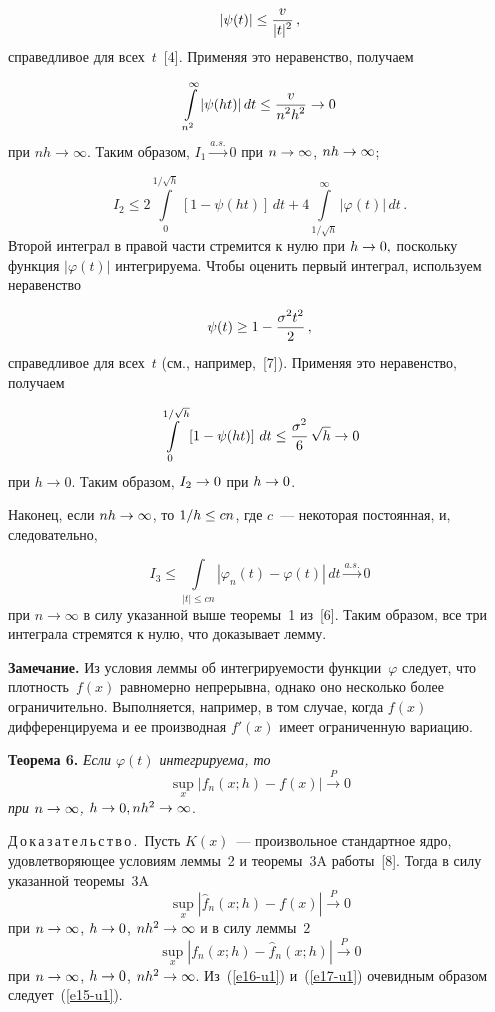 \begin{multicols}{2}
\noindent
$$
|\psi(t)|\le\displaystyle\frac{\displaystyle v\mathstrut}{\displaystyle |t|^2\mathstrut}\,,
$$
справедливое для всех~$t$~[4]. Применяя это неравенство, получаем

\noindent
$$
\int\limits_{n^2}^\infty|\psi(ht)|\,dt\le\displaystyle\frac{\displaystyle v\mathstrut}{\displaystyle n^2h^2\mathstrut}\to 0
$$
при $nh\to\infty$.
Таким образом, $I_1\xrightarrow{a.s.} 0$ при
$n\hm\to\infty$, $nh\hm\to\infty$;

\noindent
$$
I_2\le2\int\limits_0^{1/\sqrt h}\left[1-\psi(ht)\right]\,dt+
4\int\limits_{1/\sqrt h}^\infty|\varphi(t)|\,dt\,.
$$
Второй интеграл в правой части стремится к нулю при $h\hm\to 0,$ поскольку
функция $|\varphi(t)|$ интег\-ри\-ру\-ема.
Чтобы оценить первый интеграл, используем неравенство

\noindent
$$
\psi(t)\ge 1-\displaystyle\frac{\displaystyle \sigma^2t^2\mathstrut}{\displaystyle 2\mathstrut}\,,
$$
справедливое для всех~$t$ (см., например,~[7]).
Применяя это неравенство, получаем

\noindent
$$
\int\limits_0^{1/\sqrt h}\left[1-\psi(ht)\right]\,dt\le
\displaystyle\frac{\displaystyle \sigma^2\mathstrut}{\displaystyle 6\mathstrut}\,\sqrt h\to 0
$$
при $h\to 0$.
Таким образом, $I_2\hm\to0$ при $h\hm\to0$.

Наконец, если $nh\hm\to\infty$, то $1/h\hm\le cn$, где $c$~--- некоторая постоянная,
и, следовательно,

\noindent
$$
I_3\le\int\limits_{|t|\le cn}\left\vert \varphi_n(t)-\varphi(t)\right\vert\,dt
\xrightarrow{a.s.} 0
$$ 
при $n\to\infty$ в силу
указанной выше теоремы~1 из~[6]. Таким образом, все три интеграла
стремятся к нулю, что доказывает лемму.

\smallskip

\noindent
\textbf{Замечание.} Из условия леммы об интегрируемости функции~$\varphi$
следует, что плотность~$f(x)$ равномерно
непрерывна, однако оно несколько более ограничительно.
Выполняется, например, в том случае,
когда $f(x)$ дифференцируема и ее
производная $f'(x)$ имеет ограниченную вариацию.
\pagebreak


\noindent
\textbf{Теорема 6.} \textit{Если $\varphi(t)$ интегрируема, то}
\begin{equation}
\sup\limits_x|f_n(x;h)-f(x)|\xrightarrow{P} 0
\label{e15-u1}
\end{equation}
\textit{при $n\hm\to\infty$, $h\hm\to0, nh^2\hm\to\infty$}.

\medskip

\noindent
Д\,о\,к\,а\,з\,а\,т\,е\,л\,ь\,с\,т\,в\,о\,.\ 
Пусть $K(x)$~--- произвольное стандартное ядро,
удовлетворяющее условиям леммы~2 и теоремы~3A  работы~[8].
Тогда в силу указанной теоремы~3A
\begin{equation}
\sup\limits_x \left\vert\hat f_n(x;h)-f(x)\right\vert
\xrightarrow{P} 0
\label{e16-u1}
\end{equation}
при $n\hm\to\infty$, $h\hm\to0$, $nh^2\hm\to\infty$
и в силу леммы~$2$
\begin{equation}
\sup\limits_x|f_n(x;h)-\hat f_n(x;h)|\xrightarrow{P} 0
\label{e17-u1}
\end{equation}
при $n\hm\to\infty$, $h\hm\to0$, $nh^2\hm\to\infty$.
Из~(\ref{e16-u1}) и~(\ref{e17-u1}) очевидным образом следует~(\ref{e15-u1}).


\end{multicols}
